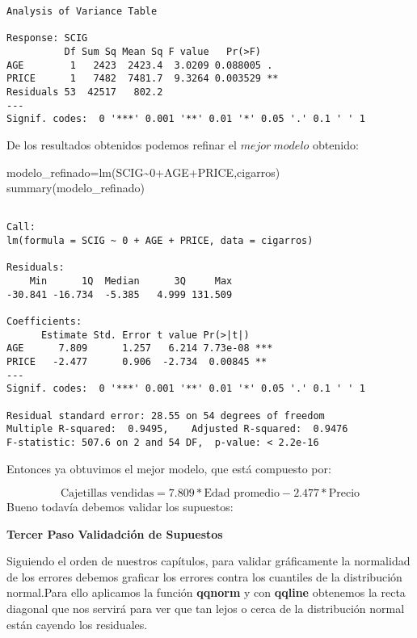 \documentclass[
  a4paper,
  oneside,
  openany]{book}
\newenvironment{Shaded}{\begin{snugshade}}{\end{snugshade}}
\newcommand{\DecValTok}[1]{\textcolor[rgb]{0.00,0.00,0.81}{#1}}
\newcommand{\FunctionTok}[1]{\textcolor[rgb]{0.00,0.00,0.00}{#1}}
\newcommand{\NormalTok}[1]{#1}
\newcommand{\OtherTok}[1]{\textcolor[rgb]{0.56,0.35,0.01}{#1}}
\newcommand{\SpecialCharTok}[1]{\textcolor[rgb]{0.00,0.00,0.00}{#1}}
\begin{document}
\begin{verbatim}
Analysis of Variance Table

Response: SCIG
          Df Sum Sq Mean Sq F value   Pr(>F)   
AGE        1   2423  2423.4  3.0209 0.088005 . 
PRICE      1   7482  7481.7  9.3264 0.003529 **
Residuals 53  42517   802.2                    
---
Signif. codes:  0 '***' 0.001 '**' 0.01 '*' 0.05 '.' 0.1 ' ' 1
\end{verbatim}

De los resultados obtenidos podemos refinar el \(mejor \ modelo\) obtenido:

\begin{Shaded}
\begin{Highlighting}[]
\NormalTok{modelo\_refinado}\OtherTok{=}\FunctionTok{lm}\NormalTok{(SCIG}\SpecialCharTok{\textasciitilde{}}\DecValTok{0}\SpecialCharTok{+}\NormalTok{AGE}\SpecialCharTok{+}\NormalTok{PRICE,cigarros)}
\FunctionTok{summary}\NormalTok{(modelo\_refinado)}
\end{Highlighting}
\end{Shaded}

\begin{verbatim}

Call:
lm(formula = SCIG ~ 0 + AGE + PRICE, data = cigarros)

Residuals:
    Min      1Q  Median      3Q     Max 
-30.841 -16.734  -5.385   4.999 131.509 

Coefficients:
      Estimate Std. Error t value Pr(>|t|)    
AGE      7.809      1.257   6.214 7.73e-08 ***
PRICE   -2.477      0.906  -2.734  0.00845 ** 
---
Signif. codes:  0 '***' 0.001 '**' 0.01 '*' 0.05 '.' 0.1 ' ' 1

Residual standard error: 28.55 on 54 degrees of freedom
Multiple R-squared:  0.9495,    Adjusted R-squared:  0.9476 
F-statistic: 507.6 on 2 and 54 DF,  p-value: < 2.2e-16
\end{verbatim}

Entonces ya obtuvimos el mejor modelo, que está compuesto por:

\[\mbox{Cajetillas vendidas}= 7.809*\mbox{Edad promedio}-2.477*\mbox{Precio}\]
Bueno todavía debemos validar los supuestos:

\textbf{Tercer Paso Validadción de Supuestos}

Siguiendo el orden de nuestros capítulos, para validar gráficamente la normalidad de los errores debemos graficar los errores contra los cuantiles de la distribución normal.Para ello aplicamos la función \textbf{qqnorm} y con \textbf{qqline} obtenemos la recta diagonal que nos servirá para ver que tan lejos o cerca de la distribución normal están cayendo los residuales.
\end{document}
